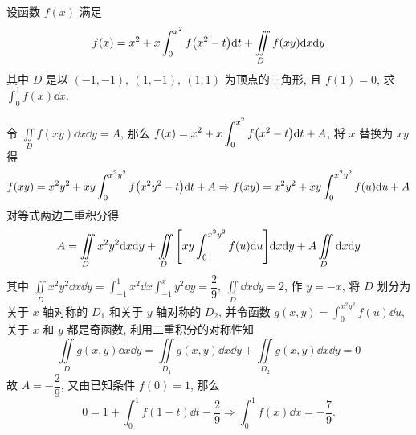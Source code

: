 \begin{example}
    设函数 $f(x)$ 满足
    $$f(x)=x^2+x\int_{0}^{x^2}f\qty(x^2-t)\dd t+\iint\limits_Df(xy)\dd x\dd y$$
    其中 $D$ 是以 $(-1,-1),~(1,-1),~(1,1)$ 为顶点的三角形, 且 $f(1)=0$, 求 $\displaystyle\int_{0}^{1}f(x)\dd x.$
\end{example}
\begin{solution}
    令 $\displaystyle\iint\limits_D f(xy)\dd x\dd y=A$, 那么 $\displaystyle f(x)=x^2+x\int_{0}^{x^2}f\qty(x^2-t)\dd t+A$, 
    将 $x$ 替换为 $xy$ 得 $$f(xy)=x^2y^2+xy\int_{0}^{x^2y^2}f\qty(x^2y^2-t)\dd t+A\Rightarrow f(xy)=x^2y^2+xy\int_{0}^{x^2y^2}f(u)\dd u+A$$
    对等式两边二重积分得 $$A=\iint\limits_D x^2y^2\dd x\dd y+\iint\limits_D\qty[xy\int_{0}^{x^2y^2}f(u)\dd u]\dd x\dd y+A\iint\limits_D \dd x\dd y$$
    其中 $\displaystyle\iint\limits_D x^2y^2\dd x\dd y=\int_{-1}^{1}x^2\dd x\int_{-1}^{x}y^2\dd y=\dfrac{2}{9},~\iint\limits_D \dd x\dd y=2$, 
    作 $y=-x$, 将 $D$ 划分为关于 $x$ 轴对称的 $D_1$ 和关于 $y$ 轴对称的 $D_2$, 并令函数 $\displaystyle g(x,y)=\int_{0}^{x^2y^2}f(u)\dd u$, 关于 $x$ 和 $y$ 都是奇函数, 利用二重积分的对称性知
    $$\iint\limits_D g(x,y)\dd x\dd y=\iint\limits_{D_1}g(x,y)\dd x\dd y+\iint\limits_{D_2}g(x,y)\dd x\dd y=0$$
    故 $A=-\dfrac{2}{9}$, 又由已知条件 $f(0)=1$, 那么
    $$0=1+\int_{0}^{1}f(1-t)\dd t-\dfrac{2}{9}\Rightarrow\int_{0}^{1}f(x)\dd x=-\dfrac{7}{9}.$$
\end{solution}

